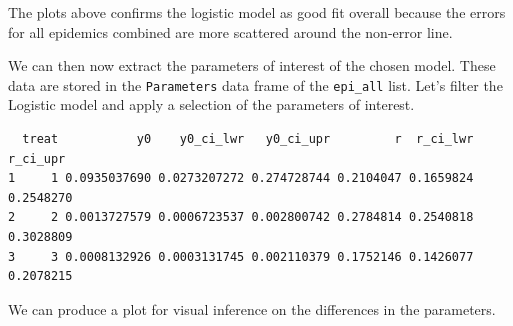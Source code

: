 \documentclass[
  letterpaper,
]{book}
\newenvironment{Shaded}{\begin{snugshade}}{\end{snugshade}}
\newcommand{\AttributeTok}[1]{\textcolor[rgb]{0.40,0.45,0.13}{#1}}
\newcommand{\DecValTok}[1]{\textcolor[rgb]{0.68,0.00,0.00}{#1}}
\newcommand{\FunctionTok}[1]{\textcolor[rgb]{0.28,0.35,0.67}{#1}}
\newcommand{\NormalTok}[1]{\textcolor[rgb]{0.00,0.23,0.31}{#1}}
\newcommand{\OtherTok}[1]{\textcolor[rgb]{0.00,0.23,0.31}{#1}}
\newcommand{\SpecialCharTok}[1]{\textcolor[rgb]{0.37,0.37,0.37}{#1}}
\newcommand{\StringTok}[1]{\textcolor[rgb]{0.13,0.47,0.30}{#1}}
\begin{document}
The plots above confirms the logistic model as good fit overall because
the errors for all epidemics combined are more scattered around the
non-error line.

We can then now extract the parameters of interest of the chosen model.
These data are stored in the \texttt{Parameters} data frame of the
\texttt{epi\_all} list. Let's filter the Logistic model and apply a
selection of the parameters of interest.

\begin{Shaded}
\end{Shaded}

\begin{verbatim}
  treat           y0    y0_ci_lwr   y0_ci_upr         r  r_ci_lwr  r_ci_upr
1     1 0.0935037690 0.0273207272 0.274728744 0.2104047 0.1659824 0.2548270
2     2 0.0013727579 0.0006723537 0.002800742 0.2784814 0.2540818 0.3028809
3     3 0.0008132926 0.0003131745 0.002110379 0.1752146 0.1426077 0.2078215
\end{verbatim}

We can produce a plot for visual inference on the differences in the
parameters.

\begin{Shaded}
\end{Shaded}
\end{document}
